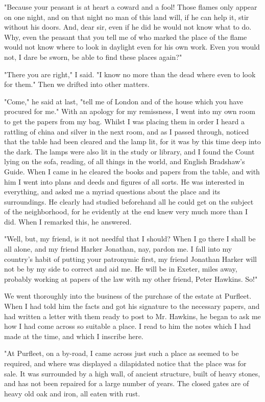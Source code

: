 "Because your peasant is at heart a coward and a fool! Those flames only appear on one night, and on that night no man of this land will, if he can help it, stir without his doors. And, dear sir, even if he did he would not know what to do. Why, even the peasant that you tell me of who marked the place of the flame would not know where to look in daylight even for his own work. Even you would not, I dare be sworn, be able to find these places again?" 

"There you are right," I said. "I know no more than the dead where even to look for them." Then we drifted into other matters. 

"Come," he said at last, "tell me of London and of the house which you have procured for me." With an apology for my remissness, I went into my own room to get the papers from my bag. Whilst I was placing them in order I heard a rattling of china and silver in the next room, and as I passed through, noticed that the table had been cleared and the lamp lit, for it was by this time deep into the dark. The lamps were also lit in the study or library, and I found the Count lying on the sofa, reading, of all things in the world, and English Bradshaw's Guide. When I came in he cleared the books and papers from the table, and with him I went into plans and deeds and figures of all sorts. He was interested in everything, and asked me a myriad questions about the place and its surroundings. He clearly had studied beforehand all he could get on the subject of the neighborhood, for he evidently at the end knew very much more than I did. When I remarked this, he answered. 

"Well, but, my friend, is it not needful that I should? When I go there I shall be all alone, and my friend Harker Jonathan, nay, pardon me. I fall into my country's habit of putting your patronymic first, my friend Jonathan Harker will not be by my side to correct and aid me. He will be in Exeter, miles away, probably working at papers of the law with my other friend, Peter Hawkins. So!" 

We went thoroughly into the business of the purchase of the estate at Purfleet. When I had told him the facts and got his signature to the necessary papers, and had written a letter with them ready to post to Mr. Hawkins, he began to ask me how I had come across so suitable a place. I read to him the notes which I had made at the time, and which I inscribe here. 

"At Purfleet, on a by-road, I came across just such a place as seemed to be required, and where was displayed a dilapidated notice that the place was for sale. It was surrounded by a high wall, of ancient structure, built of heavy stones, and has not been repaired for a large number of years. The closed gates are of heavy old oak and iron, all eaten with rust. 


